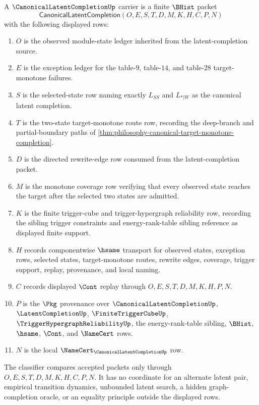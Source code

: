 \begin{definition}
\label{def:canonical-latent-completion-carrier}
A $\CanonicalLatentCompletionUp$ carrier is a finite $\BHist$ packet
$$
\mathsf{CanonicalLatentCompletion}(O,E,S,T,D,M,K,H,C,P,N)
$$
with the following displayed rows:
\begin{enumerate}
\item $O$ is the observed module-state ledger inherited from the latent-completion source.
\item $E$ is the exception ledger for the table-$9$, table-$14$, and table-$28$ target-monotone failures.
\item $S$ is the selected-state row naming exactly $L_{SS}$ and $L_{*|W}$ as the canonical latent completion.
\item $T$ is the two-state target-monotone route row, recording the deep-branch and partial-boundary paths of \autoref{thm:philosophy-canonical-target-monotone-completion}.
\item $D$ is the directed rewrite-edge row consumed from the latent-completion packet.
\item $M$ is the monotone coverage row verifying that every observed state reaches the target after the selected two states are admitted.
\item $K$ is the finite trigger-cube and trigger-hypergraph reliability row, recording the sibling trigger constraints and energy-rank-table sibling reference as displayed finite support.
\item $H$ records componentwise $\hsame$ transport for observed states, exception rows, selected states, target-monotone routes, rewrite edges, coverage, trigger support, replay, provenance, and local naming.
\item $C$ records displayed $\Cont$ replay through $O,E,S,T,D,M,K,H,P,N$.
\item $P$ is the $\Pkg$ provenance over $\CanonicalLatentCompletionUp$, $\LatentCompletionUp$, $\FiniteTriggerCubeUp$, $\TriggerHypergraphReliabilityUp$, the energy-rank-table sibling, $\BHist$, $\hsame$, $\Cont$, and $\NameCert$ rows.
\item $N$ is the local $\NameCert_{\CanonicalLatentCompletionUp}$ row.
\end{enumerate}
The classifier compares accepted packets only through $O,E,S,T,D,M,K,H,C,P,N$. It has no coordinate for an alternate latent pair, empirical transition dynamics, unbounded latent search, a hidden graph-completion oracle, or an equality principle outside the displayed rows.
\end{definition}

